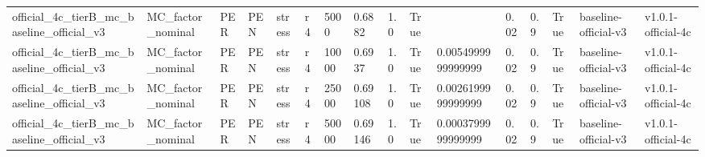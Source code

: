 \begin{table}[!htbp]
\begin{tabular}{llllllllllllllll}
official\_4c\_tierB\_mc\_baseline\_official\_v3 & MC\_factor\_nominal & PER & PEN & stress & r4 & 5000 & 0.6882 & 1.0 & True &  & 0.02 & 0.9 & True & baseline-official-v3 & v1.0.1-official-4c \\
official\_4c\_tierB\_mc\_baseline\_official\_v3 & MC\_factor\_nominal & PER & PEN & stress & r4 & 10000 & 0.6937 & 1.0 & True & 0.0054999999999999 & 0.02 & 0.9 & True & baseline-official-v3 & v1.0.1-official-4c \\
official\_4c\_tierB\_mc\_baseline\_official\_v3 & MC\_factor\_nominal & PER & PEN & stress & r4 & 25000 & 0.69108 & 1.0 & True & 0.0026199999999999 & 0.02 & 0.9 & True & baseline-official-v3 & v1.0.1-official-4c \\
official\_4c\_tierB\_mc\_baseline\_official\_v3 & MC\_factor\_nominal & PER & PEN & stress & r4 & 50000 & 0.69146 & 1.0 & True & 0.0003799999999999 & 0.02 & 0.9 & True & baseline-official-v3 & v1.0.1-official-4c \\
\bottomrule
\end{tabular}
\end{table}
